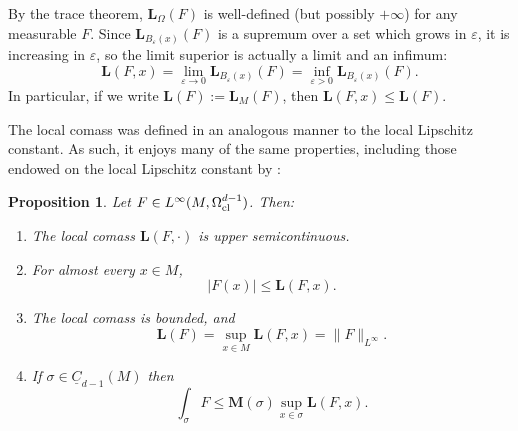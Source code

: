 \documentclass[reqno,11pt]{amsart}
\newcommand{\Chain}{\underline C}
\newcommand{\Mass}{\mathbf M}
\newcommand{\Comass}{\mathbf L}
\newtheorem{proposition}[theorem]{Proposition}
\theoremstyle{definition}
\numberwithin{equation}{section}
\begin{document}
By the trace theorem, $\Comass_\Omega(F)$ is well-defined (but possibly $+\infty$) for any measurable $F$.
Since $\Comass_{B_\varepsilon(x)}(F)$ is a supremum over a set which grows in $\varepsilon$, it is increasing in $\varepsilon$, so the limit superior is actually a limit and an infimum:
$$\Comass(F, x) = \lim_{\varepsilon \to 0} \Comass_{B_\varepsilon(x)}(F) = \inf_{\varepsilon > 0} \Comass_{B_\varepsilon(x)}(F).$$
In particular, if we write $\Comass(F) := \Comass_M(F)$, then $\Comass(F, x) \leq \Comass(F)$.

The local comass was defined in an analogous manner to the local Lipschitz constant.
As such, it enjoys many of the same properties, including those endowed on the local Lipschitz constant by \cite[Lemma 4.3]{Crandall2008}:

\begin{proposition}\label{crandall}
Let $F \in L^\infty(M, \Omega^{d - 1}_{\rm cl})$. Then:
\begin{enumerate}
\item The local comass $\Comass(F, \cdot)$ is upper semicontinuous. \label{crandall usc}
\item For almost every $x \in M$, \label{crandall LDT}
$$|F(x)| \leq \Comass(F, x).$$
\item The local comass is bounded, and \label{crandall linfinity}
$$\Comass(F) = \sup_{x \in M} \Comass(F, x) = \|F\|_{L^\infty}.$$
\item If $\sigma \in \Chain_{d - 1}(M)$ then \label{crandall best curl is ABC}
$$\int_\sigma F \leq \Mass(\sigma) \sup_{x \in \sigma} \Comass(F, x).$$
\end{enumerate}
\end{proposition}
\end{document}
